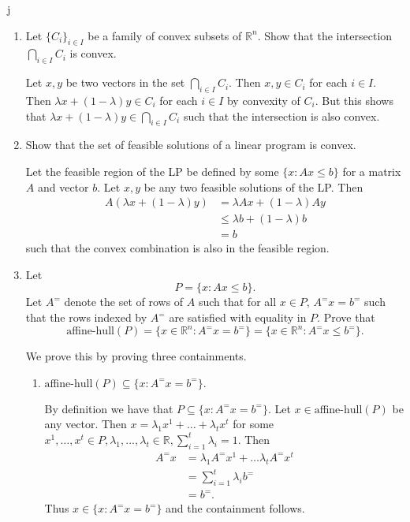 j\documentclass[11pt]{article}
\newcommand{\setR}{\mathbb{R}}
\renewcommand{\leq}{\leqslant}
\begin{document}
\begin{enumerate}[1)]
\begin{solution}
\end{solution}

\item Let $\{C_i\}_{i\in I}$ be a family of convex subsets of $\setR^n$.
  Show that the intersection $\bigcap_{i\in I} C_i$ is convex.
  
  
  \begin{solution}
  Let $x, y$ be two vectors in the set $\bigcap_{i \in I} C_i$. Then $x, y \in C_i$ for each $i \in I$. Then $\lambda x + (1-\lambda)y \in C_i$ for each $i \in I$ by convexity of $C_i$. But this shows that $\lambda x + (1-\lambda)y \in \bigcap_{i \in I}C_i$ such that the intersection is also convex.
  
  \end{solution}
  
  
\item Show that the set of feasible solutions  of a linear program  is
  convex. \label{conv:item:1}
  
  \begin{solution}
  Let the feasible region of the LP be defined by some $\{x : Ax\leq b\}$ for a matrix $A$ and vector $b$. Let $x, y$ be any two feasible solutions of the LP. Then 
  \begin{align*}
  A(\lambda x + (1 - \lambda)y) & = \lambda Ax + (1- \lambda)Ay \\
  & \leq \lambda b + (1 - \lambda)b \\
  & = b
  \end{align*}
  such that the convex combination is also in the feasible region. 
  
  
  \end{solution}
  
  \item Let $$P= \{x: Ax≤b\}.$$ 
  Let $A^=$ denote the set of rows of $A$ such that for all $x \in P$, $A^= x = b^=$ such that the rows indexed by $A^=$ are satisfied with equality in $P$. 
  Prove that 
$$\text{aﬃne-hull}(P) = \{x∈\setR^n : A^=
x= b^=\}= \{x∈\setR^n : A^=
x≤b^=\}.$$


\begin{solution}
We prove this by proving three containments.
\begin{enumerate}
\item $\text{aﬃne-hull}(P) ⊆
\{x: A^=
x= b^=\}.$ 


By definition we have that $P ⊆\{x: A^=
x= b^=\}$. Let $x∈\text{aﬃne-hull}(P)$ be any vector. Then $x= λ_1x^1 +\hdots+ λ_tx^t$ for some $x^1,\hdots,x^t ∈P, λ_1,...,λ_t ∈\setR, \sum_{i=1}^t λ_i = 1$. 
Then 
\begin{align*}
A^=x & = \lambda_1 A^= x^1 + \hdots \lambda_t A^= x^t \\
& = \displaystyle\sum_{i =1}^t\lambda_i b^= \\
& = b^=.
\end{align*}
Thus $x \in \{x : A^= x = b^=\}$ and the containment follows.


\end{enumerate}
\end{solution}
\end{enumerate}
\end{document}
